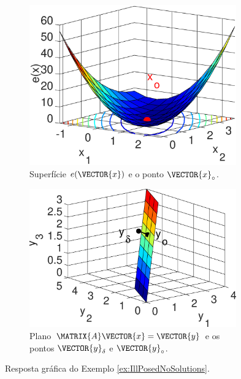 \begin{figure}[h!]
     \centering
     \begin{subfigure}[b]{0.475\textwidth}
         \centering
         \includegraphics[width=0.98\textwidth]{chapters/notacao/mfiles/illpossed1/surfcex.eps}
         \caption{Superfície $e(\VECTOR{x})$ e o ponto $\VECTOR{x}_{\circ}$. }
         \label{fig:ex:IllPosedNoSolutions:a}
     \end{subfigure}
     \hfill
     \begin{subfigure}[b]{0.475\textwidth}
         \centering
         \includegraphics[width=0.98\textwidth]{chapters/notacao/mfiles/illpossed1/surfcax.eps}
         \caption{Plano $\MATRIX{A}\VECTOR{x}=\VECTOR{y}$ e os pontos $\VECTOR{y}_{\delta}$ e $\VECTOR{y}_{\circ}$.}
         \label{fig:ex:IllPosedNoSolutions:b}
     \end{subfigure}
        \caption{Resposta gráfica do Exemplo \ref{ex:IllPosedNoSolutions}. }
        \label{fig:ex:IllPosedNoSolutions}
\end{figure}

